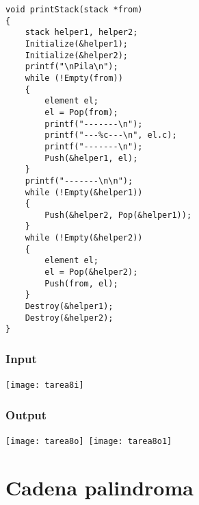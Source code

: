 \documentclass[11pt,a4paper]{report}
\begin{document}
\begin{lstlisting}
void printStack(stack *from)
{
    stack helper1, helper2;
    Initialize(&helper1);
    Initialize(&helper2);
    printf("\nPila\n");
    while (!Empty(from))
    {
        element el;
        el = Pop(from);
        printf("-------\n");
        printf("---%c---\n", el.c);
        printf("-------\n");
        Push(&helper1, el);
    }
    printf("-------\n\n");
    while (!Empty(&helper1))
    {
        Push(&helper2, Pop(&helper1));
    }
    while (!Empty(&helper2))
    {
        element el;
        el = Pop(&helper2);
        Push(from, el);
    }
    Destroy(&helper1);
    Destroy(&helper2);
}
\end{lstlisting}
			\subsection{Input}
\texttt{[image: tarea8i]}\
			\subsection{Output}
\texttt{[image: tarea8o]}\
\texttt{[image: tarea8o1]}\

	\chapter{Cadena palindroma}
\end{document}
